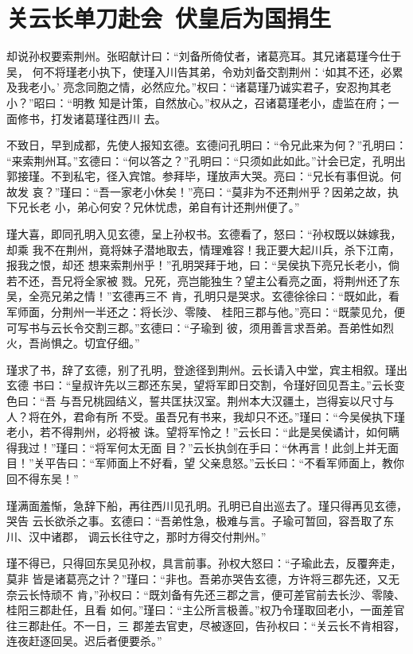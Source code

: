 \chapter{关云长单刀赴会~伏皇后为国捐生}

却说孙权要索荆州。张昭献计曰：“刘备所倚仗者，诸葛亮耳。其兄诸葛瑾今仕于吴，
何不将瑾老小执下，使瑾入川告其弟，令劝刘备交割荆州：‘如其不还，必累及我老小。’
亮念同胞之情，必然应允。”权曰：“诸葛瑾乃诚实君子，安忍拘其老小？”昭曰：“明教
知是计策，自然放心。”权从之，召诸葛瑾老小，虚监在府；一面修书，打发诸葛瑾往西川
去。

不致日，早到成都，先使人报知玄德。玄德问孔明曰：“令兄此来为何？”孔明曰：
“来索荆州耳。”玄德曰：“何以答之？”孔明曰：“只须如此如此。”计会已定，孔明出
郭接瑾。不到私宅，径入宾馆。参拜毕，瑾放声大哭。亮曰：“兄长有事但说。何故发
哀？”瑾曰：“吾一家老小休矣！”亮曰：“莫非为不还荆州乎？因弟之故，执下兄长老
小，弟心何安？兄休忧虑，弟自有计还荆州便了。”

瑾大喜，即同孔明入见玄德，呈上孙权书。玄德看了，怒曰：“孙权既以妹嫁我，却乘
我不在荆州，竟将妹子潜地取去，情理难容！我正要大起川兵，杀下江南，报我之恨，却还
想来索荆州乎！”孔明哭拜于地，曰：“吴侯执下亮兄长老小，倘若不还，吾兄将全家被
戮。兄死，亮岂能独生？望主公看亮之面，将荆州还了东吴，全亮兄弟之情！”玄德再三不
肯，孔明只是哭求。玄德徐徐曰：“既如此，看军师面，分荆州一半还之：将长沙、零陵、
桂阳三郡与他。”亮曰：“既蒙见允，便可写书与云长令交割三郡。”玄德曰：“子瑜到
彼，须用善言求吾弟。吾弟性如烈火，吾尚惧之。切宜仔细。”

瑾求了书，辞了玄德，别了孔明，登途径到荆州。云长请入中堂，宾主相叙。瑾出玄德
书曰：“皇叔许先以三郡还东吴，望将军即日交割，令瑾好回见吾主。”云长变色曰：“吾
与吾兄桃园结义，誓共匡扶汉室。荆州本大汉疆土，岂得妄以尺寸与人？将在外，君命有所
不受。虽吾兄有书来，我却只不还。”瑾曰：“今吴侯执下瑾老小，若不得荆州，必将被
诛。望将军怜之！”云长曰：“此是吴侯谲计，如何瞒得我过！”瑾曰：“将军何太无面
目？”云长执剑在手曰：“休再言！此剑上并无面目！”关平告曰：“军师面上不好看，望
父亲息怒。”云长曰：“不看军师面上，教你回不得东吴！”

瑾满面羞惭，急辞下船，再往西川见孔明。孔明已自出巡去了。瑾只得再见玄德，哭告
云长欲杀之事。玄德曰：“吾弟性急，极难与言。子瑜可暂回，容吾取了东川、汉中诸郡，
调云长往守之，那时方得交付荆州。”

瑾不得已，只得回东吴见孙权，具言前事。孙权大怒曰：“子瑜此去，反覆奔走，莫非
皆是诸葛亮之计？”瑾曰：“非也。吾弟亦哭告玄德，方许将三郡先还，又无奈云长恃顽不
肯，”孙权曰：“既刘备有先还三郡之言，便可差官前去长沙、零陵、桂阳三郡赴任，且看
如何。”瑾曰：“主公所言极善。”权乃令瑾取回老小，一面差官往三郡赴任。不一日，三
郡差去官吏，尽被逐回，告孙权曰：“关云长不肯相容，连夜赶逐回吴。迟后者便要杀。”

